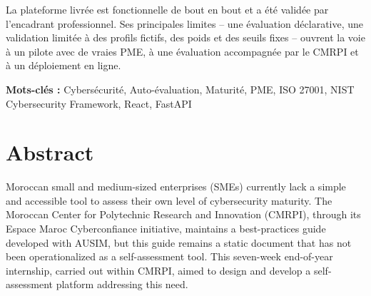 \documentclass[12pt, a4paper, oneside]{report}
\begin{document}
La plateforme livrée est fonctionnelle de bout en bout et a été validée par l'encadrant professionnel. Ses principales limites -- une évaluation déclarative, une validation limitée à des profils fictifs, des poids et des seuils fixes -- ouvrent la voie à un pilote avec de vraies PME, à une évaluation accompagnée par le CMRPI et à un déploiement en ligne.

\vspace{6pt}
\textbf{Mots-clés :} Cybersécurité, Auto-évaluation, Maturité, PME, ISO 27001, NIST Cybersecurity Framework, React, FastAPI

\newpage


\chapter*{Abstract}

Moroccan small and medium-sized enterprises (SMEs) currently lack a simple and accessible tool to assess their own level of cybersecurity maturity. The Moroccan Center for Polytechnic Research and Innovation (CMRPI), through its Espace Maroc Cyberconfiance initiative, maintains a best-practices guide developed with AUSIM, but this guide remains a static document that has not been operationalized as a self-assessment tool. This seven-week end-of-year internship, carried out within CMRPI, aimed to design and develop a self-assessment platform addressing this need.
\end{document}
